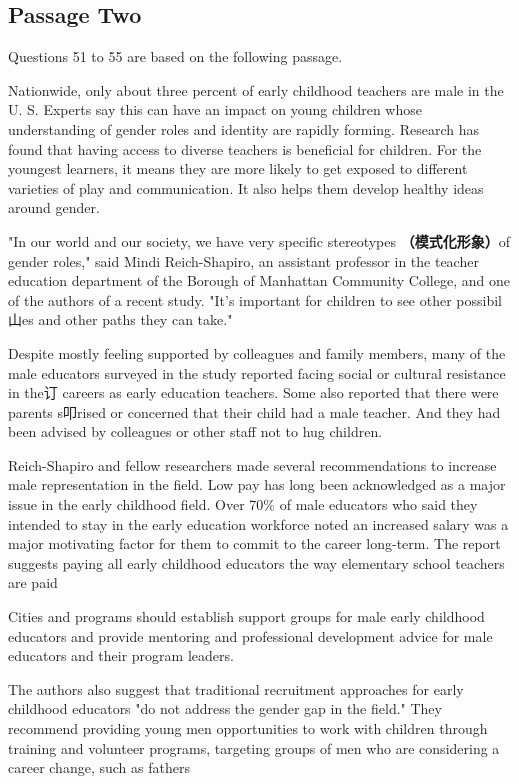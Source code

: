 \documentclass[UTF8,11pt]{ctexart}
\begin{document}
\subsection*{Passage Two}


Questions 51 to 55 are based on the following passage.


Nationwide, only about three percent of early childhood teachers are male in the U. S. Experts say this can have an impact on young children whose understanding of gender roles and identity are rapidly forming. Research has found that having access to diverse teachers is beneficial for children. For the youngest learners, it means they are more likely to get exposed to different varieties of play and communication. It also helps them develop healthy ideas around gender.


"In our world and our society, we have very specific stereotypes\textbf{ （模式化形象）}of gender roles," said Mindi Reich-Shapiro, an assistant professor in the teacher education department of the Borough of Manhattan Community College, and one of the authors of a recent study. "It's important for children to see other possibil山es and other paths they can take."


Despite mostly feeling supported by colleagues and family members, many of the male educators surveyed in the study reported facing social or cultural resistance in the订 careers as early education teachers. Some also reported that there were parents s叩rised or concerned that their child had a male teacher. And they had been advised by colleagues or other staff not to hug children.


Reich-Shapiro and fellow researchers made several recommendations to increase male representation in the field. Low pay has long been acknowledged as a major issue in the early childhood field. Over 70\% of male educators who said they intended to stay in the early education workforce noted an increased salary was a major motivating factor for them to commit to the career long-term. The report suggests paying all early childhood educators the way elementary school teachers are paid


Cities and programs should establish support groups for male early childhood educators and provide mentoring and professional development advice for male educators and their program leaders.


The authors also suggest that traditional recruitment approaches for early childhood educators "do not address the gender gap in the field." They recommend providing young men opportunities to work with children through training and volunteer programs, targeting groups of men who are considering a career change, such as fathers
\end{document}
